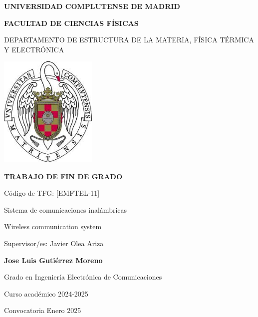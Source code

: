 \documentclass[11pt, a4paper]{article} %
\begin{document}
\begin{titlepage}
\centering
{ \bfseries \Large UNIVERSIDAD COMPLUTENSE DE MADRID}
\vspace{0.5cm}

{\bfseries  \Large FACULTAD DE CIENCIAS FÍSICAS} 
\vspace{1cm}

{\large DEPARTAMENTO DE ESTRUCTURA DE LA MATERIA, FÍSICA TÉRMICA Y ELECTRÓNICA}
\vspace{0.8cm}

{\includegraphics[width=0.35\textwidth]{logo_UCM}}

\vspace{0.8cm}


{\bfseries \Large TRABAJO DE FIN DE GRADO}
\vspace{2cm}

{\Large Código de TFG:  [EMFTEL-11] } \vspace{5mm}

{\Large Sistema de comunicaciones inalámbricas}\vspace{5mm}

{\Large Wireless communication system}\vspace{5mm}

{\Large Supervisor/es: Javier Olea Ariza}\vspace{20mm} 

{\bfseries \LARGE Jose Luis Gutiérrez Moreno}\vspace{5mm} 

{\large Grado en Ingeniería Electrónica de Comunicaciones}\vspace{5mm} 

{\large Curso acad\'emico 2024-2025}\vspace{5mm} 

{\large Convocatoria Enero 2025}\vspace{5mm} 

\end{titlepage}
\end{document}
